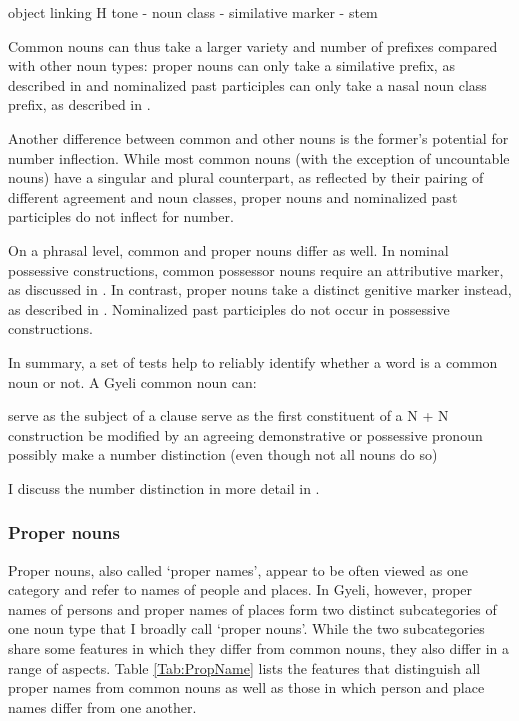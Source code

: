 \begin{exe}
\ex \label{Nstruc}  object linking H tone - noun class - similative marker - stem
\end{exe}

Common nouns can thus take a larger variety and number of prefixes compared with other noun types: proper nouns can only take a similative prefix, as described in  and nominalized past participles can only take a nasal noun class prefix, as described in .

Another difference between common and other nouns is the former's potential for number inflection. While most common nouns (with the exception of uncountable nouns) have a singular and plural counterpart, as reflected by their pairing of different agreement and noun classes, proper nouns and nominalized past participles do not inflect for number.

On a phrasal level, common and proper nouns differ as well. In nominal possessive constructions, common possessor nouns  require an attributive marker, as discussed in . In contrast, proper nouns take a distinct genitive marker instead, as described in . Nominalized past participles do not occur in possessive constructions.


In summary, a set of tests help to reliably identify whether a word is a common noun or not. A Gyeli common noun can:

\begin{enumerate}
\itshapeem serve as the subject of a clause
\itshapeem serve as  the  first constituent of a N + N construction
\itshapeem be modified by an agreeing demonstrative or possessive pronoun
\itshapeem possibly make a number distinction (even though not all nouns do so) 
\end{enumerate}

\noindent I discuss the number distinction in more detail in .






\subsubsection{Proper nouns}
\label{sec:properN}



Proper nouns, also called `proper names',  appear to be often viewed as one category and refer to names of people and places.  In Gyeli, however, proper names of persons and proper names of places form two distinct subcategories of one noun type that I broadly call `proper nouns'.  While the two subcategories share some features in which they differ from common nouns, they also differ in a range of aspects. Table \ref{Tab:PropName} lists the features that distinguish all proper names from common nouns as well as those in which person and place names differ from one another.


